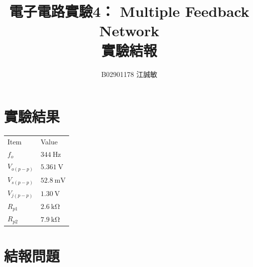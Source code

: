 \documentclass[12pt, a4paper]{article}
\title{ \bf {\Huge 電子電路實驗4： Multiple Feedback Network  }\\ 實驗結報}
\author{B02901178 江誠敏}
\begin{document}
\maketitle


\section{實驗結果}
\begin{center}
\begin{tabular}{p{3cm}p{3cm}}
	\hline
  Item & Value\\
	\hhline{==}
  $f_o$ & $\SI{344}\Hz$ \\
  $V_{o(p-p)}$ & $\SI{5.361}\V$ \\
  $V_{s(p-p)}$ & $\SI{52.8}\mV$ \\
  $V_{j(p-p)}$ & $\SI{1.30}\V$ \\
  $R_{p1}$ & $\SI{2.6}\kohm$ \\
  $R_{p2}$ & $\SI{7.9}\kohm$ \\
	\hline
\end{tabular}
\end{center}
\section{結報問題}
\end{document}
